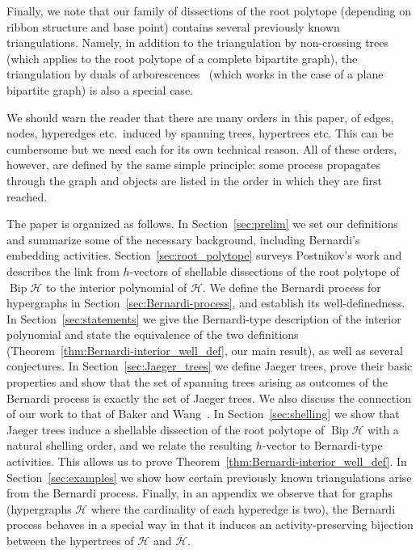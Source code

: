 \documentclass[ALCO,ThmDefs,Unicode,epreuves]{cedram}
\newcommand{\HH}{\mathcal H}
\DeclareMathOperator{\bip}{Bip}
\begin{document}
Finally, we note that our family of dissections of the root polytope (depending on ribbon structure and base point) contains several previously known triangulations. Namely, in addition to the triangulation by non-crossing trees~\cite{GGP} (which applies to the root polytope of a complete bipartite graph), the triangulation by duals of arborescences~\cite{KM} (which works in the case of a plane bipartite graph) is also a special case.

We should warn the reader that there are many orders in this paper, of edges, nodes, hyperedges etc.\ induced by spanning trees, hypertrees etc. This can be cumbersome but we need each for its own technical reason. All of these orders, however, are defined by the same simple principle: some process propagates through the graph and objects are listed in the order in which they are first reached. 

The paper is organized as follows. 
In Section~\ref{sec:prelim} we set our definitions and summarize some of the necessary background, including Bernardi's embedding activities. 
Section~\ref{sec:root_polytope} surveys Postnikov's work and describes the link from $h$-vectors of shellable dissections of the root polytope of $\bip \HH$ to the interior polynomial of $\HH$. 
We define the Bernardi process for hypergraphs in Section~\ref{sec:Bernardi-process}, and establish its well-definedness. 
In Section~\ref{sec:statements} we give the Bernardi-type description of the interior polynomial and state the equivalence of the two definitions (Theorem~\ref{thm:Bernardi-interior_well_def}, our main result), as well as several conjectures. 
In Section~\ref{sec:Jaeger_trees} we define Jaeger trees, prove their basic properties and show that the set of spanning trees arising as outcomes of the Bernardi process is exactly the set of Jaeger trees. We also discuss the connection of our work to that of Baker and Wang~\cite{Baker-Wang}. 
In Section~\ref{sec:shelling} we show that Jaeger trees induce a shellable dissection of the root polytope of $\bip \HH$ with a natural shelling order, and we relate the resulting $h$-vector to Bernardi-type activities. This allows us to prove Theorem~\ref{thm:Bernardi-interior_well_def}.
In Section~\ref{sec:examples} we show how certain previously known triangulations arise from the Bernardi process.
Finally, in an appendix we observe that for graphs (\ie hypergraphs $\HH$ where the cardinality of each hyperedge is two), the Bernardi process behaves in a special way in that it induces an activity-preserving bijection between the hypertrees of $\HH$ and $\overline{\HH}$. 
\end{document}
